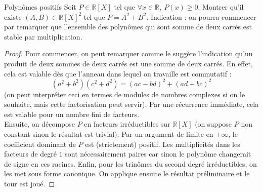 \documentclass[french,a4paper]{article}
\newcommand{\R}{\mathbb{R}}
\theoremstyle{plain}
\theoremstyle{definition}
\theoremstyle{remark}
\begin{document}
\begin{ex}{Polynômes positifs}
	Soit $P\in\R[X]$ tel que $\forall x\in\R,\ P(x)\geqslant 0$. Montrer qu'il existe $(A,B)\in\R[X]^2$ tel que $P=A^2+B^2$. Indication : on pourra commencer par remarquer que l'ensemble des polynômes qui sont somme de deux carrés est stable par multiplication.
\end{ex}
\begin{proof}
	Pour commencer, on peut remarquer comme le suggère l'indication qu'un produit de deux sommes de deux carrés est une somme de deux carrés. En effet, cela est valable dès que l'anneau dans lequel on travaille est commutatif : $$(a^2+b^2)(c^2+d^2)=(ac-bd)^2+(ad+bc)^2$$ (on peut interpréter ceci en termes de modules de nombres complexes si on le souhaite, mais cette factorisation peut servir). Par une récurrence immédiate, cela est valable pour un nombre fini de facteurs. \\
	Ensuite, on décompose $P$ en facteurs irréductibles sur $\R[X]$ (on suppose $P$ non constant sinon le résultat est trivial). Par un argument de limite en $+\infty$, le coefficient dominant de $P$ est (strictement) positif. Les multiplicités dans les facteurs de degré $1$ sont nécessairement paires car sinon le polynôme changerait de signe en ces racines. Enfin, pour les trinômes du second degré irréductibles, on les met sous forme canonique. On applique ensuite le résultat préliminaire et le tour est joué.
\end{proof}
\end{document}
